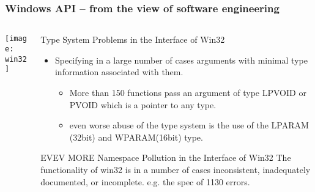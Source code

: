 \begin{frame}[plain]
	\frametitle{Windows API -- from the view of software engineering}
	
	
	
	\begin{columns}
		
		\begin{column}{.4\textwidth}
			
			\texttt{[image: win32]}
			
		\end{column}
		
		\begin{column}{.6\textwidth}
			
			Type System Problems in the Interface of Win32
			
			\begin{itemize}
				\item Specifying in a large number
				of cases arguments with minimal type information associated with them. 
				\begin{itemize}	
					\item More than 150 functions pass an argument of type LPVOID or PVOID which is a 	pointer to any type.
					
					\item  even worse abuse of the type system is the use of the LPARAM (32bit) and WPARAM(16bit) type.
				\end{itemize}
			\end{itemize}
		
		EVEV MORE
		\newline \newline
		Namespace Pollution in the Interface of Win32
		\newline \newline
		The functionality of win32 is in a number of cases inconsistent, inadequately documented, or incomplete.  e.g. the spec of 1130 errors.
		
		\end{column}		
	\end{columns}
	
	
\end{frame}

